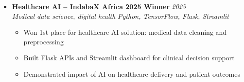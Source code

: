 \documentclass[a4paper,11pt]{article}
\begin{document}
\begin{itemize}[leftmargin=*, label={-}]
\item \textbf{Healthcare AI -- IndabaX Africa 2025 Winner} \hfill \textit{2025} \\
\textit{Medical data science, digital health} \hfill \textit{Python, TensorFlow, Flask, Streamlit}
\vspace{-2pt}
    \begin{itemize}[leftmargin=0.4cm, nosep, label=\tiny$\bullet$]
        \item \small{Won 1st place for healthcare AI solution: medical data cleaning and preprocessing}
        \item \small{Built Flask APIs and Streamlit dashboard for clinical decision support}
        \item \small{Demonstrated impact of AI on healthcare delivery and patient outcomes}
    \end{itemize}
\vspace{3pt}

\end{itemize}
\end{document}
